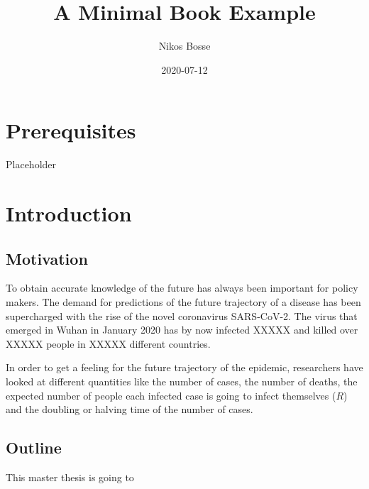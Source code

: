 \documentclass[
]{book}
\title{A Minimal Book Example}
\author{Nikos Bosse}
\date{2020-07-12}
\begin{document}
\maketitle

{
\setcounter{tocdepth}{1}
\tableofcontents
}
\hypertarget{prerequisites}{%
\chapter{Prerequisites}\label{prerequisites}}

Placeholder

\hypertarget{introduction}{%
\chapter{Introduction}\label{introduction}}

\hypertarget{motivation}{%
\section{Motivation}\label{motivation}}

To obtain accurate knowledge of the future has always been important for policy makers. The demand for predictions of the future trajectory of a disease has been supercharged with the rise of the novel coronavirus SARS-CoV-2. The virus that emerged in Wuhan in January 2020 has by now infected XXXXX and killed over XXXXX people in XXXXX different countries.

In order to get a feeling for the future trajectory of the epidemic, researchers have looked at different quantities like the number of cases, the number of deaths, the expected number of people each infected case is going to infect themselves (\(R\)) and the doubling or halving time of the number of cases.

\hypertarget{outline}{%
\section{Outline}\label{outline}}

This master thesis is going to
\end{document}
